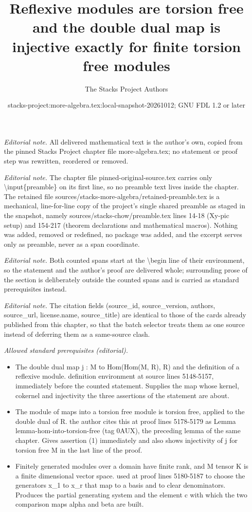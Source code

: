 \documentclass[10pt,a4paper]{amsart}
\title{Reflexive modules are torsion free and the double dual map is injective exactly for finite torsion free modules}
\author{The Stacks Project Authors}
\date{stacks-project:more-algebra.tex:local-snapshot-20261012; GNU FDL 1.2 or later}
\theoremstyle{plain}
\theoremstyle{definition}
\theoremstyle{remark}
\numberwithin{equation}{subsection}
\begin{document}
\maketitle
\setcounter{subsection}{1}
\noindent\textit{Editorial note.} All delivered mathematical text is the author's own, copied from the pinned Stacks Project chapter file more-algebra.tex; no statement or proof step was rewritten, reordered or removed.\par\medskip
\noindent\textit{Editorial note.} The chapter file pinned-original-source.tex carries only \textbackslash{}input\{preamble\} on its first line, so no preamble text lives inside the chapter. The retained file sources/stacks-more-algebra/retained-preamble.tex is a mechanical, line-for-line copy of the project's single shared preamble as staged in the snapshot, namely sources/stacks-chow/preamble.tex lines 14-18 (Xy-pic setup) and 154-217 (theorem declarations and mathematical macros). Nothing was added, removed or redefined, no package was added, and the excerpt serves only as preamble, never as a span coordinate.\par\medskip
\noindent\textit{Editorial note.} Both counted spans start at the \textbackslash{}begin line of their environment, so the statement and the author's proof are delivered whole; surrounding prose of the section is deliberately outside the counted spans and is carried as standard prerequisites instead.\par\medskip
\noindent\textit{Editorial note.} The citation fields (source\_id, source\_version, authors, source\_url, license.name, source\_title) are identical to those of the cards already published from this chapter, so that the batch selector treats them as one source instead of deferring them as a same-source clash.\par\medskip
\noindent\textit{Allowed standard prerequisites (editorial).}\begin{itemize}
\item The double dual map j : M to Hom(Hom(M, R), R) and the definition of a reflexive module. definition environment at source lines 5148-5157, immediately before the counted statement. Supplies the map whose kernel, cokernel and injectivity the three assertions of the statement are about.
\item The module of maps into a torsion free module is torsion free, applied to the double dual of R. the author cites this at proof lines 5178-5179 as Lemma lemma-hom-into-torsion-free (tag 0AUX), the preceding lemma of the same chapter. Gives assertion (1) immediately and also shows injectivity of j for torsion free M in the last line of the proof.
\item Finitely generated modules over a domain have finite rank, and M tensor K is a finite dimensional vector space. used at proof lines 5180-5187 to choose the generators x\_1 to x\_r that map to a basis and to clear denominators. Produces the partial generating system and the element c with which the two comparison maps alpha and beta are built.
\end{itemize}\medskip
\end{document}
